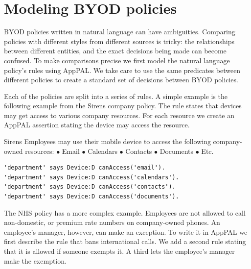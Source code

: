 \documentclass[thesis.tex]{subfiles}
\begin{document}

\section{Modeling BYOD policies}

BYOD policies written in natural language can have ambiguities. Comparing
policies with different styles from different sources is tricky: the
relationships between different entities, and the exact decisions being made can
become confused. To make comparisons precise we first model the natural language
policy's rules using AppPAL. We take care to use the same predicates between
different policies to create a standard set of decisions between \ac{BYOD}
policies.

Each of the policies are split into a series of rules. A simple example is the
following example from the Sirens company policy. The rule states that devices
may get access to various company resources. For each resource we create an
AppPAL assertion stating the device may access the resource.

\begin{policyrule}{Sirens}
  Employees may use their mobile device to access the following company-owned resources:
  \newline $\bullet$ Email $\bullet$ Calendars $\bullet$ Contacts $\bullet$ Documents $\bullet$ Etc.
  \normalfont
  \begin{lstlisting}
'department' says Device:D canAccess('email').
'department' says Device:D canAccess('calendars').
'department' says Device:D canAccess('contacts').
'department' says Device:D canAccess('documents').
  \end{lstlisting}
\end{policyrule}

The NHS policy has a more complex example. Employees are not
allowed to call non-domestic, or premium rate numbers on company-owned
phones. An employee's manager, however, can make an exception.
To write it in AppPAL we first describe the
rule that bans international calls. We add a second rule stating that it is
allowed if someone exempts it. A third lets the employee's manager 
make the exemption.
\end{document}

